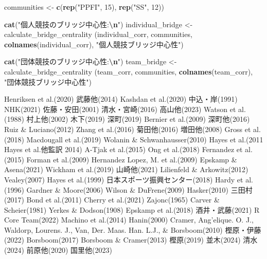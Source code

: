 \documentclass[12pt,a4paper,xelatex,ja=standard]{bxjsarticle}
\newenvironment{Shaded}{\begin{snugshade}}{\end{snugshade}}
\newcommand{\DecValTok}[1]{\textcolor[rgb]{0.00,0.00,0.81}{#1}}
\newcommand{\FunctionTok}[1]{\textcolor[rgb]{0.13,0.29,0.53}{\textbf{#1}}}
\newcommand{\NormalTok}[1]{#1}
\newcommand{\OtherTok}[1]{\textcolor[rgb]{0.56,0.35,0.01}{#1}}
\newcommand{\SpecialCharTok}[1]{\textcolor[rgb]{0.81,0.36,0.00}{\textbf{#1}}}
\newcommand{\StringTok}[1]{\textcolor[rgb]{0.31,0.60,0.02}{#1}}
\begin{document}
\begin{Shaded}
\begin{Highlighting}[]
\NormalTok{communities }\OtherTok{\textless{}{-}} \FunctionTok{c}\NormalTok{(}\FunctionTok{rep}\NormalTok{(}\StringTok{"PPFI"}\NormalTok{, }\DecValTok{15}\NormalTok{), }\FunctionTok{rep}\NormalTok{(}\StringTok{"SS"}\NormalTok{, }\DecValTok{12}\NormalTok{)) }

\FunctionTok{cat}\NormalTok{(}\StringTok{"個人競技のブリッジ中心性:}\SpecialCharTok{\textbackslash{}n}\StringTok{"}\NormalTok{)}
\NormalTok{individual\_bridge }\OtherTok{\textless{}{-}}\NormalTok{ calculate\_bridge\_centrality}
\NormalTok{(individual\_corr, communities, }
  \FunctionTok{colnames}\NormalTok{(individual\_corr), }\StringTok{"個人競技ブリッジ中心性"}\NormalTok{)}

\FunctionTok{cat}\NormalTok{(}\StringTok{"団体競技のブリッジ中心性:}\SpecialCharTok{\textbackslash{}n}\StringTok{"}\NormalTok{)}
\NormalTok{team\_bridge }\OtherTok{\textless{}{-}}\NormalTok{ calculate\_bridge\_centrality}
\NormalTok{(team\_corr, communities, }
\FunctionTok{colnames}\NormalTok{(team\_corr), }\StringTok{"団体競技ブリッジ中心性"}\NormalTok{)}
\end{Highlighting}
\end{Shaded}

\clearpage

Henriksen et al.(2020) 武藤他(2014) Kashdan et al.(2020) 中込・岸(1991)
NHK(2021) 佐藤・安田(2001) 清水・宮崎(2016) 高山他(2023) Watson et
al.(1988) 村上他(2002) 木下(2019) 深町(2019) Bernier et al.(2009)
深町他(2016) Ruiz \& Luciano(2012) Zhang et al.(2016) 菊田他(2016)
増田他(2008) Gross et al.(2018) Macdougall et al.(2019) Wolanin \&
Schwanhausser(2010) Hayes et al.(2011 Hayes et al.他監訳 2014) A-Tjak et
al.(2015) Ong et al.(2018) Fernandez et al.(2015) Forman et al.(2009)
Hernandez Lopez, M. et al.(2009) Epskamp \& Asena(2021) Wickham et
al.(2019) 山崎他(2021) Lilienfeld \& Arkowitz(2012) Vealey(2007) Hayes
et al.(1999) 日本スポーツ振興センター(2018) Hardy et al.(1996) Gardner
\& Moore(2006) Wilson \& DuFrene(2009) Hasker(2010) 三田村(2017) Bond et
al.(2011) Cherry et al.(2021) Zajonc(1965) Carver \& Scheier(1981)
Yerkes \& Dodson(1908) Epskamp et al.(2018) 酒井・武藤(2021) R Core
Team(2022) Machino et al.(2014) Hanin(2000) Cramer, Ang'elique. O. J.,
Waldorp, Lourens. J., Van, Der. Maas. Han. L.J., \& Borsboom(2010)
樫原・伊藤(2022) Borsboom(2017) Borsboom \& Cramer(2013) 樫原(2019)
並木(2024) 清水(2024) 前原他(2020) 国里他(2023)
\end{document}
